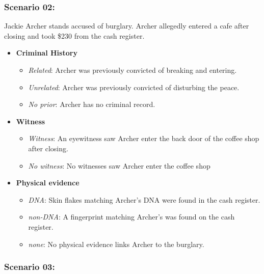 \documentclass[
]{article}
\providecommand{\tightlist}{%
  \setlength{\itemsep}{0pt}\setlength{\parskip}{0pt}}
\begin{document}
\hypertarget{scenario-02}{%
\subsubsection{Scenario 02:}\label{scenario-02}}

Jackie Archer stands accused of burglary. Archer allegedly entered a
cafe after closing and took \$230 from the cash register.

\begin{itemize}
\tightlist
\item
  \textbf{Criminal History}

  \begin{itemize}
  \tightlist
  \item
    \emph{Related}: Archer was previously convicted of breaking and
    entering.
  \item
    \emph{Unrelated}: Archer was previously convicted of disturbing the
    peace.
  \item
    \emph{No prior}: Archer has no criminal record.
  \end{itemize}
\item
  \textbf{Witness}

  \begin{itemize}
  \tightlist
  \item
    \emph{Witness}: An eyewitness saw Archer enter the back door of the
    coffee shop after closing.
  \item
    \emph{No witness}: No witnesses saw Archer enter the coffee shop
  \end{itemize}
\item
  \textbf{Physical evidence}

  \begin{itemize}
  \tightlist
  \item
    \emph{DNA}: Skin flakes matching Archer's DNA were found in the cash
    register.
  \item
    \emph{non-DNA}: A fingerprint matching Archer's was found on the
    cash register.
  \item
    \emph{none}: No physical evidence links Archer to the burglary.
  \end{itemize}
\end{itemize}

\hypertarget{scenario-03}{%
\subsubsection{Scenario 03:}\label{scenario-03}}
\end{document}

